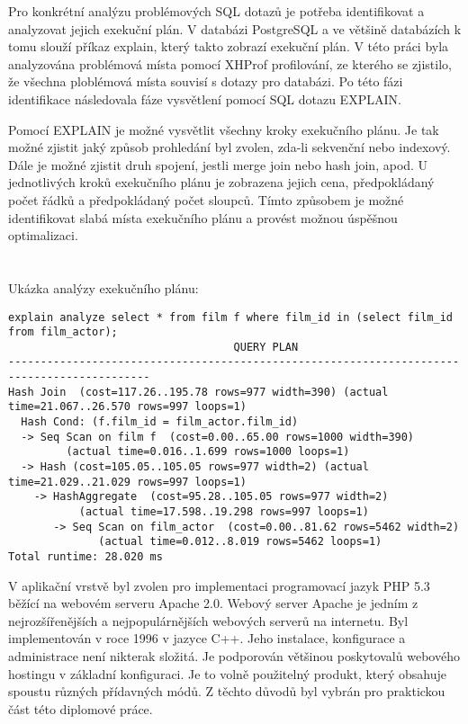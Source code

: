 \documentclass[12pt]{article}
\begin{document}
Pro konkrétní analýzu problémových SQL dotazů je potřeba identifikovat a analyzovat jejich exekuční plán. V databázi PostgreSQL a ve většině databázích k tomu slouží příkaz explain, který takto zobrazí exekuční plán. V této práci byla analyzována problémová místa pomocí XHProf profilování, ze kterého se zjistilo, že všechna ploblémová místa souvisí s dotazy pro databázi. Po této fázi identifikace následovala fáze vysvětlení pomocí SQL dotazu EXPLAIN.

Pomocí EXPLAIN je možné vysvětlit všechny kroky exekučního plánu. Je tak možné zjistit jaký způsob prohledání byl zvolen, zda-li sekvenční nebo indexový. Dále je možné zjistit druh spojení, jestli merge join nebo hash join, apod. U jednotlivých kroků exekučního plánu je zobrazena jejich cena, předpokládaný počet řádků a předpokládaný počet sloupců. Tímto způsobem je možné identifikovat slabá místa exekučního plánu a provést možnou úspěšnou optimalizaci.\\
\\
\\ Ukázka analýzy exekučního plánu:
\begin{scriptsize}
\begin{verbatim}
explain analyze select * from film f where film_id in (select film_id from film_actor);
                                   QUERY PLAN
--------------------------------------------------------------------------------------------
Hash Join  (cost=117.26..195.78 rows=977 width=390) (actual time=21.067..26.570 rows=997 loops=1)
  Hash Cond: (f.film_id = film_actor.film_id)
  -> Seq Scan on film f  (cost=0.00..65.00 rows=1000 width=390) 
  	     (actual time=0.016..1.699 rows=1000 loops=1)
  -> Hash (cost=105.05..105.05 rows=977 width=2) (actual time=21.029..21.029 rows=997 loops=1)
    -> HashAggregate  (cost=95.28..105.05 rows=977 width=2) 
           (actual time=17.598..19.298 rows=997 loops=1)
       -> Seq Scan on film_actor  (cost=0.00..81.62 rows=5462 width=2) 
              (actual time=0.012..8.019 rows=5462 loops=1)
Total runtime: 28.020 ms
\end{verbatim}
\end{scriptsize}


V aplikační vrstvě byl zvolen pro implementaci programovací jazyk PHP 5.3 běžící na webovém serveru Apache 2.0. Webový server Apache je jedním z nejrozšířenějších a nejpopulárnějších webových serverů na internetu. Byl implementován v roce 1996 v jazyce C++. Jeho instalace, konfigurace a administrace není nikterak složitá. Je podporován většinou poskytovalů webového hostingu v základní konfiguraci. Je to volně použitelný produkt, který obsahuje spoustu různých přídavných módů. Z těchto důvodů byl vybrán pro praktickou část této diplomové práce.
\end{document}
